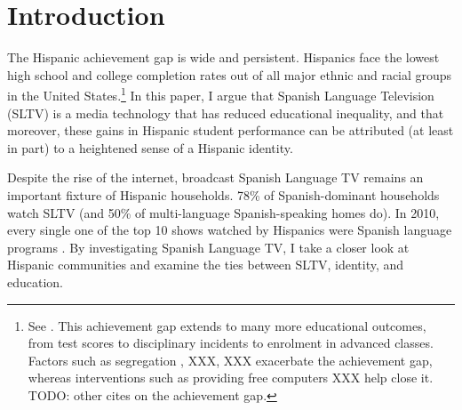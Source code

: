 \documentclass[11pt]{article}
\begin{document}
\renewcommand{\thefootnote}{\fnsymbol{footnote}}


\thispagestyle{empty}

\newpage 
\renewcommand{\thefootnote}{\arabic{footnote}}

\pagebreak 
\setcounter{page}{0}


\onehalfspacing


\newpage

\setcounter{page}{1}
\section{Introduction}


The Hispanic achievement gap is wide and persistent. Hispanics face the lowest high school and college completion rates out of all major ethnic and racial groups in the United States.\footnote{ See \cite{tienda_hispanicity_2009}. This achievement gap extends to many more educational outcomes, from test scores to disciplinary incidents to enrolment in advanced classes. Factors such as segregation \citep{cascio_cracks_2012}, XXX, XXX exacerbate the achievement gap, whereas interventions such as providing free computers \citep{fairlie2012academic} XXX help close it.  TODO: other cites on the achievement gap. } In this paper, I argue that Spanish Language Television (SLTV) is a media technology that has reduced educational inequality, and that moreover, these gains in Hispanic student performance can be attributed (at least in part) to a heightened sense of a Hispanic identity.

Despite the rise of the internet, broadcast Spanish Language TV remains an important fixture of Hispanic households. 78\% of Spanish-dominant households watch SLTV (and 50\% of multi-language Spanish-speaking homes do). In 2010, every single one of the top 10 shows watched by Hispanics were Spanish language programs \citep{pardo_three_2011}. By investigating Spanish Language TV, I take a closer look at Hispanic communities and examine the ties between SLTV, identity, and education. 
\end{document}
